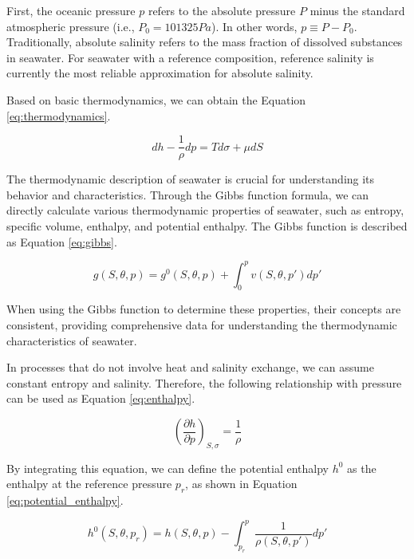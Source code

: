 \documentclass[12pt]{article}
\begin{document}
First, the oceanic pressure $p$ refers to the absolute pressure $P$ minus the standard atmospheric pressure (i.e., $P_0 = 101325Pa$). In other words, $p\equiv P-P_0$. Traditionally, absolute salinity refers to the mass fraction of dissolved substances in seawater. For seawater with a reference composition, reference salinity is currently the most reliable approximation for absolute salinity.

Based on basic thermodynamics, we can obtain the Equation \ref{eq:thermodynamics}.

\begin{equation}
    dh - \frac{1}{\rho}dp = Td\sigma + \mu dS \label{eq:thermodynamics}
\end{equation}

The thermodynamic description of seawater is crucial for understanding its behavior and characteristics. Through the Gibbs function formula, we can directly calculate various thermodynamic properties of seawater, such as entropy, specific volume, enthalpy, and potential enthalpy. The Gibbs function is described as Equation \ref{eq:gibbs}.

\begin{equation}
    g(S, \theta, p) = g^0(S, \theta, p) + \int_0^p v(S, \theta, p')dp' \label{eq:gibbs}
\end{equation}

When using the Gibbs function to determine these properties, their concepts are consistent, providing comprehensive data for understanding the thermodynamic characteristics of seawater.

In processes that do not involve heat and salinity exchange, we can assume constant entropy and salinity. Therefore, the following relationship with pressure can be used as Equation \ref{eq:enthalpy}.

\begin{equation}
    \left(\frac{\partial h}{\partial p}\right)_{S,\sigma} = \frac{1}{\rho} \label{eq:enthalpy}
\end{equation}

By integrating this equation, we can define the potential enthalpy $h^0$ as the enthalpy at the reference pressure $p_r$, as shown in Equation \ref{eq:potential_enthalpy}.

\begin{equation}
    h^0(S,\theta,p_r) = h(S,\theta,p) - \int_{p_r}^p \frac{1}{\rho(S,\theta,p')}dp' \label{eq:potential_enthalpy}
\end{equation}
\end{document}
